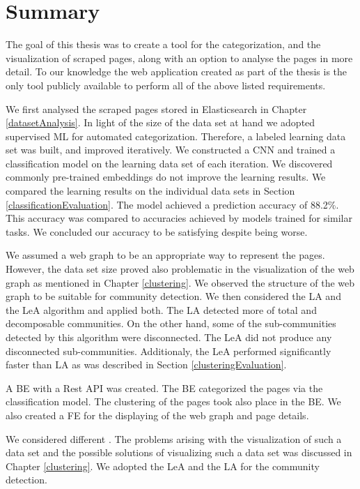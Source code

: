 \section{Summary}
The goal of this thesis was to create a tool for the categorization, and the visualization of scraped pages, along with an option to analyse the pages in more detail. To our knowledge the web application created as part of the thesis is the only tool publicly available to perform all of the above listed requirements.

We first analysed the scraped pages stored in Elasticsearch in Chapter \ref{datasetAnalysis}. In light of the size of the data set at hand we adopted supervised ML for automated categorization. Therefore, a labeled learning data set was built, and improved iteratively. We constructed a CNN and trained a classification model on the learning data set of each iteration. We discovered commonly pre-trained embeddings do not improve the learning results. We compared the learning results on the individual data sets in Section \ref{classificationEvaluation}. The model achieved a prediction accuracy of 88.2\%. This accuracy was compared to accuracies achieved by models trained for similar tasks. We concluded our accuracy to be satisfying despite being worse.

 We assumed a web graph to be an appropriate way to represent the pages. However, the data set size proved also problematic in the visualization of the web graph as mentioned in Chapter \ref{clustering}. We observed the structure of the web graph to be suitable for community detection. We then considered the LA and the LeA algorithm and applied both. The LA detected more of total and decomposable communities. On the other hand, some of the sub-communities detected by this algorithm were disconnected. The LeA did not produce any disconnected sub-communities. Additionaly, the LeA performed significantly faster than LA as was described in Section \ref{clusteringEvaluation}.

A BE with a Rest API was created. The BE categorized the pages via the classification model. The clustering of the pages took also place in the BE. We also created a FE for the displaying of the web graph and page details. 

We considered different  . The problems arising with the visualization of such a data set and the possible solutions of visualizing such a data set was discussed in Chapter \ref{clustering}. We adopted the LeA and the LA for the community detection.

